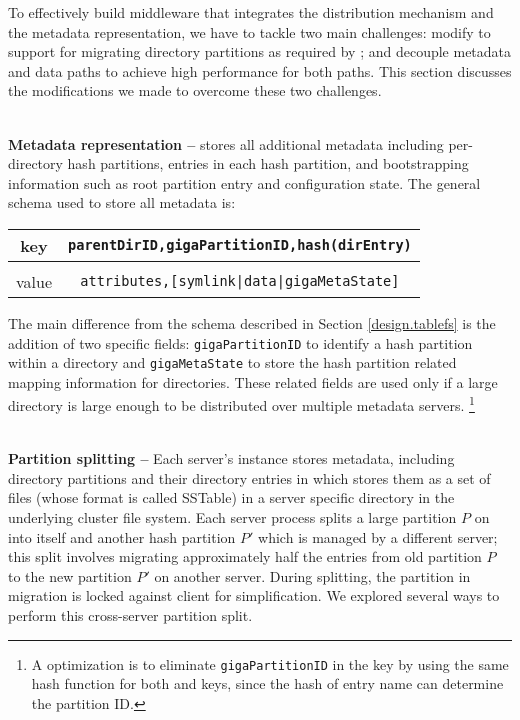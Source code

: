 To effectively build \sys middleware that integrates
the \giga distribution mechanism and the \tfs metadata representation,
we have to tackle two main challenges:
modify \tfs to support for
migrating directory partitions as required by \giga;
and decouple metadata and data paths to
achieve high performance for both paths.
This section discusses the modifications we made to
overcome these two challenges.


~\\
\textbf{Metadata representation -- }
\tfs stores all additional metadata including \giga per-directory hash
partitions, entries in each hash partition, and \giga
bootstrapping information such as root partition entry
and \giga configuration state.
The general schema used to store all metadata is:

\begin{table}[!htc]
\center
\vspace{10pt}
\begin{tabular}{c|c}
key & \texttt{parentDirID,gigaPartitionID,hash(dirEntry)} \\
\midrule \\
value & \texttt{attributes,[symlink|data|gigaMetaState]} \\
\end{tabular}
\label{tab:keyschema}
\end{table}

The main difference from the \tfs schema described in Section
\ref{design.tablefs} is the addition of two \giga specific fields:
\texttt{gigaPartitionID} to identify a
\giga hash partition within a directory and \texttt{gigaMetaState} to store the
hash partition related mapping information for directories.
These \giga related fields are used only
if a large directory is large enough to be
distributed over multiple metadata servers.
\footnote{A optimization is to eliminate \texttt{gigaPartitionID} in the key
by using the same hash function for both \giga and \tfs keys,
since the hash of entry name can determine the partition ID.}

~\\
\textbf{Partition splitting -- }
Each server's \tfs instance stores metadata,
including \giga directory partitions and their directory
entries in \ldb which stores them as
a set of files (whose format is called SSTable) in a server specific directory
in the underlying cluster file system.
Each \giga server process splits a large partition $P$ on
into itself and another hash partition $P'$ which is managed by a
different server; this split involves migrating approximately half the entries
from old partition $P$ to the new partition $P'$ on another server.
During splitting, the partition in migration is locked against client
for simplification. We explored several ways
to perform this cross-server partition split.

